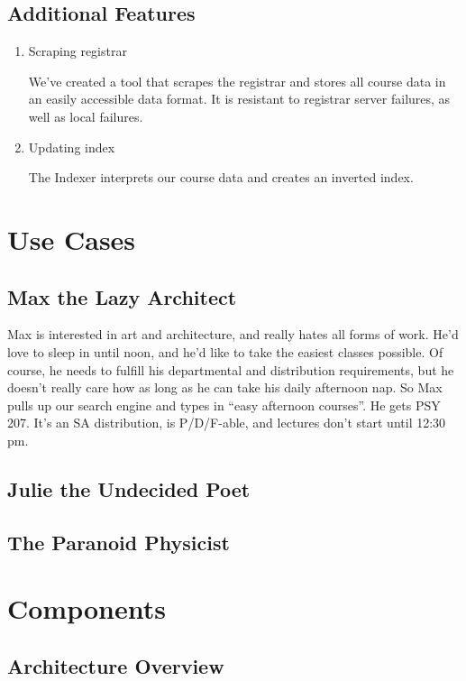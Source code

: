 \documentclass[12pt,letterpaper]{article}
\begin{document}
	\subsection{Additional Features}
		\begin{enumerate}
			\item Scraping registrar
			
			We've created a tool that scrapes the registrar and stores all course data in an easily accessible data format. It is resistant to registrar server failures, as well as local failures.
			
			\item Updating index
			
			The Indexer interprets our course data and creates an inverted index.
			
		\end{enumerate}

	\section{Use Cases}
		\subsection{Max the Lazy Architect}
		Max is interested in art and architecture, and really hates all forms of work. He'd love to sleep in until noon, and he'd like to take the easiest classes possible. Of course, he needs to fulfill his departmental and distribution requirements, but he doesn't really care how as long as he can take his daily afternoon nap. So Max pulls up our search engine and types in ``easy afternoon courses''. He gets PSY 207. It's an SA distribution, is P/D/F-able, and lectures don't start until 12:30 pm.   
		
		
		\subsection{Julie the Undecided Poet}
		\subsection{The Paranoid Physicist}

\section{Components}
	\subsection{Architecture Overview}
\end{document}
